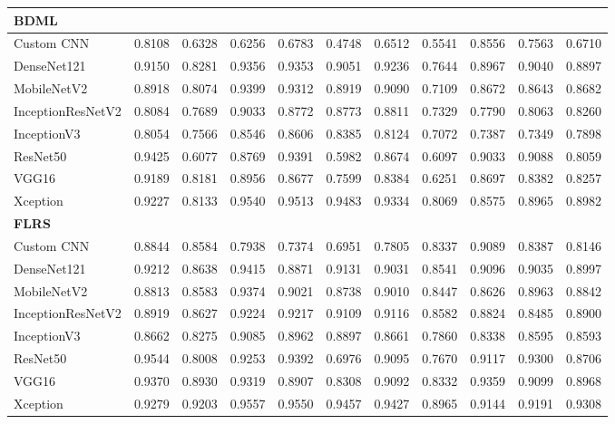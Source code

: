 \documentclass[a4paper,fleqn]{cas-dc}
\begin{document}
\begin{table}[t]
\begin{tabular}{l *{10}{r}}
        \midrule
        \multicolumn{11}{l}{\textbf{BDML}} \\
        \midrule
        Custom CNN        & 0.8108 & 0.6328 & 0.6256 & 0.6783 & 0.4748 & 0.6512 & 0.5541 & 0.8556 & 0.7563 & 0.6710 \\
        DenseNet121       & 0.9150 & 0.8281 & 0.9356 & 0.9353 & 0.9051 & 0.9236 & 0.7644 & 0.8967 & 0.9040 & 0.8897 \\
        MobileNetV2       & 0.8918 & 0.8074 & 0.9399 & 0.9312 & 0.8919 & 0.9090 & 0.7109 & 0.8672 & 0.8643 & 0.8682 \\
        InceptionResNetV2 & 0.8084 & 0.7689 & 0.9033 & 0.8772 & 0.8773 & 0.8811 & 0.7329 & 0.7790 & 0.8063 & 0.8260 \\
        InceptionV3       & 0.8054 & 0.7566 & 0.8546 & 0.8606 & 0.8385 & 0.8124 & 0.7072 & 0.7387 & 0.7349 & 0.7898 \\
        ResNet50          & 0.9425 & 0.6077 & 0.8769 & 0.9391 & 0.5982 & 0.8674 & 0.6097 & 0.9033 & 0.9088 & 0.8059 \\
        VGG16             & 0.9189 & 0.8181 & 0.8956 & 0.8677 & 0.7599 & 0.8384 & 0.6251 & 0.8697 & 0.8382 & 0.8257 \\
        Xception          & 0.9227 & 0.8133 & 0.9540 & 0.9513 & 0.9483 & 0.9334 & 0.8069 & 0.8575 & 0.8965 & 0.8982 \\

        \midrule
        \multicolumn{11}{l}{\textbf{FLRS}} \\
        \midrule
        Custom CNN        & 0.8844 & 0.8584 & 0.7938 & 0.7374 & 0.6951 & 0.7805 & 0.8337 & 0.9089 & 0.8387 & 0.8146 \\
        DenseNet121       & 0.9212 & 0.8638 & 0.9415 & 0.8871 & 0.9131 & 0.9031 & 0.8541 & 0.9096 & 0.9035 & 0.8997 \\
        MobileNetV2       & 0.8813 & 0.8583 & 0.9374 & 0.9021 & 0.8738 & 0.9010 & 0.8447 & 0.8626 & 0.8963 & 0.8842 \\
        InceptionResNetV2 & 0.8919 & 0.8627 & 0.9224 & 0.9217 & 0.9109 & 0.9116 & 0.8582 & 0.8824 & 0.8485 & 0.8900 \\
        InceptionV3       & 0.8662 & 0.8275 & 0.9085 & 0.8962 & 0.8897 & 0.8661 & 0.7860 & 0.8338 & 0.8595 & 0.8593 \\
        ResNet50          & 0.9544 & 0.8008 & 0.9253 & 0.9392 & 0.6976 & 0.9095 & 0.7670 & 0.9117 & 0.9300 & 0.8706 \\
        VGG16             & 0.9370 & 0.8930 & 0.9319 & 0.8907 & 0.8308 & 0.9092 & 0.8332 & 0.9359 & 0.9099 & 0.8968 \\
        Xception          & 0.9279 & 0.9203 & 0.9557 & 0.9550 & 0.9457 & 0.9427 & 0.8965 & 0.9144 & 0.9191 & 0.9308 \\


\end{tabular}
\end{table}
\end{document}
